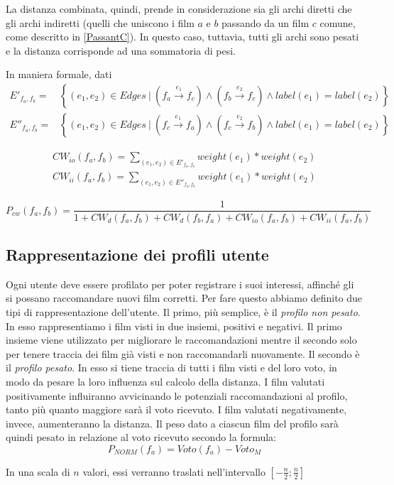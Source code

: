 La distanza combinata, quindi, prende in considerazione sia gli archi diretti che gli archi indiretti (quelli che uniscono i film $a$ e $b$ passando da un film $c$ comune, come descritto in \ref{PassantC}). In questo caso, tuttavia, tutti gli archi sono pesati e la distanza corrisponde ad una sommatoria di pesi.

In maniera formale, dati
\begin{eqnarray*}
E'_{f_a,f_b} = & \left\{ (e_1, e_2) \in Edges ~ \big\vert ~ (f_a \xrightarrow{e_1} f_c) \wedge (f_b \xrightarrow{e_2} f_c) \wedge label(e_1)=label(e_2) \right\} \\
E''_{f_a,f_b} = & \left\{ (e_1, e_2) \in Edges ~ \big\vert ~ (f_c \xrightarrow{e_1} f_a) \wedge (f_c \xrightarrow{e_2} f_b) \wedge label(e_1)=label(e_2) \right\}
\end{eqnarray*}

\begin{eqnarray*}
CW_{io}(f_a,f_b) = \sum_{(e_1,e_2) \in E'_{f_a,f_b}}{weight(e_1)*weight(e_2)}\\
CW_{ii}(f_a,f_b) = \sum_{(e_1,e_2) \in E''_{f_a,f_b}}{weight(e_1)*weight(e_2)}
\end{eqnarray*}

\begin{equation*}
P_{cw}(f_{a},f_{b}) = \frac{1} {1+CW_{d}(f_a,f_b)+CW_{d}(f_b,f_a)+CW_{io}(f_a,f_b)+CW_{ii}(f_a,f_b)}
\end{equation*}

\subsection{Rappresentazione dei profili utente}
\label{profili}

Ogni utente deve essere profilato per poter registrare i suoi interessi,
affinché gli si possano raccomandare nuovi film corretti.
Per fare questo abbiamo definito due tipi di rappresentazione dell'utente.
Il primo, più semplice, è il \emph{profilo non pesato}. In esso rappresentiamo i film visti in due insiemi, positivi e negativi. Il primo insieme viene utilizzato per migliorare le raccomandazioni mentre il secondo solo per tenere traccia dei film già visti e non raccomandarli nuovamente.
Il secondo è il \emph{profilo pesato}. In esso si tiene traccia di tutti i film
visti e del loro voto, in modo da pesare la loro influenza sul calcolo della
distanza. I film valutati positivamente influiranno avvicinando le potenziali raccomandazioni al profilo, tanto più quanto maggiore sarà il voto ricevuto. I film valutati negativamente, invece, aumenteranno la distanza.
Il peso dato a ciascun film del profilo sarà quindi pesato in relazione al voto ricevuto secondo la formula:
$$
P_{NORM}(f_a) = Voto(f_a)- Voto_M
$$

In una scala di $n$ valori, essi verranno traslati nell'intervallo $\left[-\frac{n}{2};\frac{n}{2}\right]$
